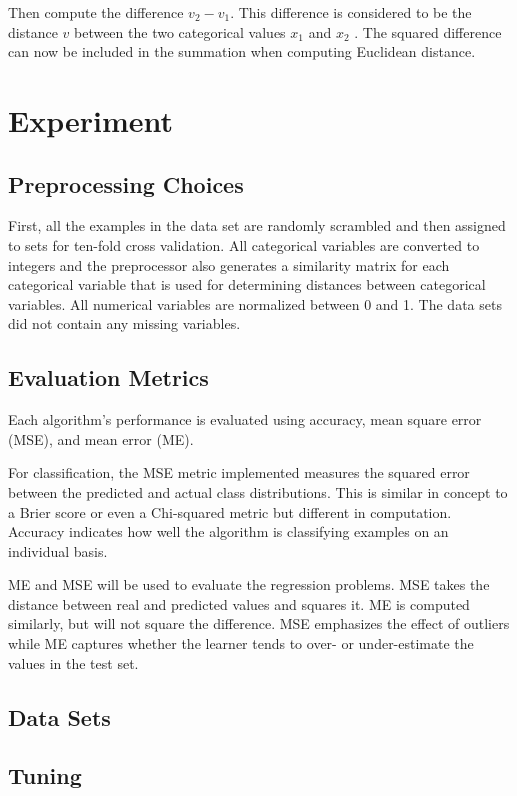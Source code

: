 \documentclass[twoside,11pt]{article}
\begin{document}
Then compute the difference
$v_2 - v_1$.
This difference is considered to be the distance $v$ between the two categorical values $x_1$ and $x_2$ \citep{vdm}. The squared difference can now be included in the summation when computing Euclidean distance. %

\section{Experiment}

\subsection{Preprocessing Choices}
First, all the examples in the data set are randomly scrambled and then assigned to sets
for ten-fold cross validation. All categorical variables are converted to integers and the
preprocessor also generates a similarity matrix for each categorical variable that is used for
determining distances between categorical variables. All numerical variables are normalized
between 0 and 1. The data sets did not contain any missing variables.
\subsection{Evaluation Metrics}
Each algorithm's performance is evaluated using accuracy, mean square error (MSE), and mean error (ME).

For classification, the MSE metric implemented measures the squared error between the predicted and actual class distributions. This is similar in concept to a Brier score or even a Chi-squared metric but different in computation.  Accuracy indicates how well the algorithm is classifying examples on an individual basis.

ME and MSE will be used to evaluate the regression problems. MSE takes the distance between real and predicted values and squares it. ME is computed similarly, but will not square the difference. MSE emphasizes the effect of outliers while ME captures whether the learner tends to over- or under-estimate the values in the test set.
\subsection{Data Sets}
\subsection{Tuning}
\end{document}
